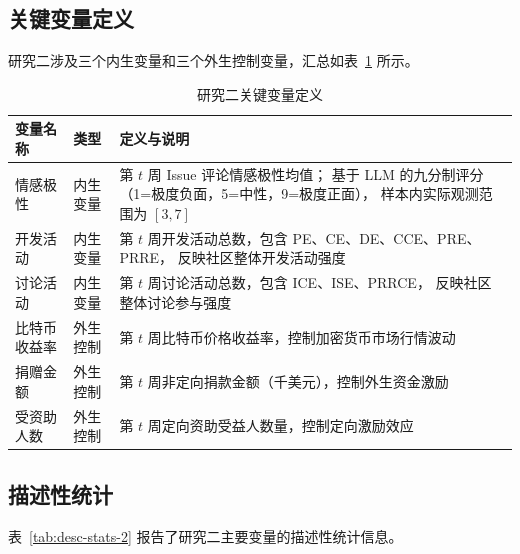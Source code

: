 \documentclass[
    type = master, %
    degree = professional,        %
    decl-page,  %
    twoside,                %
    fontset = fandol %
  ]{njuthesis}
\begin{document}
\subsection{关键变量定义}

研究二涉及三个内生变量和三个外生控制变量，汇总如表~\ref{tab:variables-2} 所示。

\begin{table}[htbp]
    \centering
    \caption{研究二关键变量定义}
    \label{tab:variables-2}
    \small
    \begin{tabularx}{\textwidth}{p{4.5cm}lX}
        \toprule
        变量名称 & 类型 & 定义与说明 \\
        \midrule
        情感极性
            & 内生变量
            & 第 $t$ 周 Issue 评论情感极性均值；
              基于 LLM 的九分制评分（1=极度负面，5=中性，9=极度正面），
              样本内实际观测范围为 $[3,7]$ \\[4pt]
        开发活动
            & 内生变量
            & 第 $t$ 周开发活动总数，包含 PE、CE、DE、CCE、PRE、PRRE，
              反映社区整体开发活动强度 \\[4pt]
        讨论活动
            & 内生变量
            & 第 $t$ 周讨论活动总数，包含 ICE、ISE、PRRCE，
              反映社区整体讨论参与强度 \\[4pt]
        比特币收益率
            & 外生控制
            & 第 $t$ 周比特币价格收益率，控制加密货币市场行情波动 \\[4pt]
        捐赠金额
            & 外生控制
            & 第 $t$ 周非定向捐款金额（千美元），控制外生资金激励 \\[4pt]
        受资助人数
            & 外生控制
            & 第 $t$ 周定向资助受益人数量，控制定向激励效应 \\
        \bottomrule
    \end{tabularx}
\end{table}

\subsection{描述性统计}

表~\ref{tab:desc-stats-2} 报告了研究二主要变量的描述性统计信息。
\end{document}

